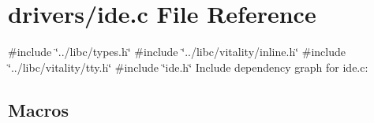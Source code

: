 \hypertarget{a00032}{}\section{drivers/ide.c File Reference}
\label{a00032}
{\ttfamily \#include \char`\"{}../libc/types.\+h\char`\"{}}\newline
{\ttfamily \#include \char`\"{}../libc/vitality/inline.\+h\char`\"{}}\newline
{\ttfamily \#include \char`\"{}../libc/vitality/tty.\+h\char`\"{}}\newline
{\ttfamily \#include \char`\"{}ide.\+h\char`\"{}}\newline
Include dependency graph for ide.\+c\+:
\subsection*{Macros}
